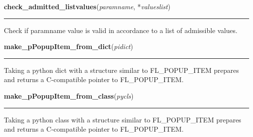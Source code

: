     \label{xformslib:library:check_admitted_listvalues}

    \vspace{0.5ex}

\hspace{.8\funcindent}\begin{boxedminipage}{\funcwidth}

    \raggedright \textbf{check\_admitted\_listvalues}(\textit{paramname}, *\textit{valueslist})

    \vspace{-1.5ex}

    \rule{\textwidth}{0.5\fboxrule}
\setlength{\parskip}{2ex}
    Check if paramname value is valid in accordance to a list of admissible
    values.

\setlength{\parskip}{1ex}
    \end{boxedminipage}

    \label{xformslib:library:make_pPopupItem_from_dict}

    \vspace{0.5ex}

\hspace{.8\funcindent}\begin{boxedminipage}{\funcwidth}

    \raggedright \textbf{make\_pPopupItem\_from\_dict}(\textit{pidict})

    \vspace{-1.5ex}

    \rule{\textwidth}{0.5\fboxrule}
\setlength{\parskip}{2ex}
    Taking a python dict with a structure similar to FL\_POPUP\_ITEM 
    prepares and returns a C-compatible pointer to FL\_POPUP\_ITEM.

\setlength{\parskip}{1ex}
    \end{boxedminipage}

    \label{xformslib:library:make_pPopupItem_from_class}

    \vspace{0.5ex}

\hspace{.8\funcindent}\begin{boxedminipage}{\funcwidth}

    \raggedright \textbf{make\_pPopupItem\_from\_class}(\textit{pycls})

    \vspace{-1.5ex}

    \rule{\textwidth}{0.5\fboxrule}
\setlength{\parskip}{2ex}
    Taking a python class with a structure similar to FL\_POPUP\_ITEM 
    prepares and returns a C-compatible pointer to FL\_POPUP\_ITEM.

\setlength{\parskip}{1ex}
    \end{boxedminipage}

